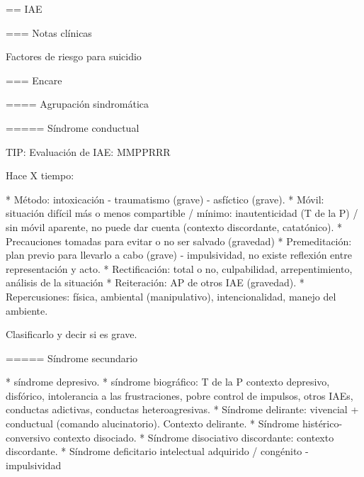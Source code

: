 == IAE

=== Notas clínicas

Factores de riesgo para suicidio

=== Encare

==== Agrupación sindromática

===== Síndrome conductual

TIP: Evaluación de IAE: MMPPRRR

Hace X tiempo:

* Método: intoxicación - traumatismo (grave) - asfíctico (grave).
* Móvil: situación difícil más o menos compartible / mínimo: inautenticidad (T de la P) / sin móvil aparente, no puede dar cuenta (contexto discordante, catatónico).
* Precauciones tomadas para evitar o no ser salvado (gravedad)
* Premeditación: plan previo para llevarlo a cabo (grave) - impulsividad, no existe reflexión entre representación y acto.
* Rectificación: total o no, culpabilidad, arrepentimiento, análisis de la situación
* Reiteración: AP de otros IAE (gravedad).
* Repercusiones: física, ambiental (manipulativo), intencionalidad, manejo del ambiente.

Clasificarlo y decir si es grave.

===== Síndrome secundario

* síndrome depresivo.
* síndrome biográfico: T de la P contexto depresivo, disfórico, intolerancia a las frustraciones, pobre control de impulsos, otros IAEs, conductas adictivas, conductas heteroagresivas.
* Síndrome delirante: vivencial + conductual (comando alucinatorio). Contexto delirante.
* Síndrome histérico-conversivo contexto disociado.
* Síndrome disociativo discordante: contexto discordante.
* Síndrome deficitario intelectual adquirido / congénito - impulsividad
